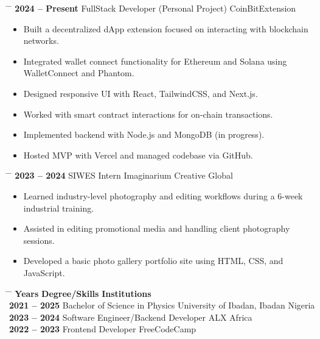 \documentclass{article}
\newcommand{\sectiondivider}[2][0.4]{%
    \noindent
    \vspace{3pt}
    \textcolor{black}{%
        \noindent
        \makebox[\linewidth]{\rule{#1\linewidth}{0.5pt}%
        \hspace{5pt} \textbf{\uppercase{#2}} \hspace{5pt}%
        \rule{#1\linewidth}{0.5pt}}%
    }
    \vspace{3pt}
}
\begin{document}
\vspace{0.2cm}
\noindent
\begin{tabbing}
    \hspace{5cm} \= \hspace{8cm} \= \kill 
    \textbf{2024 -- Present} \> FullStack Developer (Personal Project)  \> CoinBitExtension \\[0.1cm]
\end{tabbing}
\vspace{-0.3cm}
\begin{itemize}
    \item Built a decentralized dApp extension focused on interacting with blockchain networks.
    \item Integrated wallet connect functionality for Ethereum and Solana using WalletConnect and Phantom.
    \item Designed responsive UI with React, TailwindCSS, and Next.js.
    \item Worked with smart contract interactions for on-chain transactions.
    \item Implemented backend with Node.js and MongoDB (in progress).
    \item Hosted MVP with Vercel and managed codebase via GitHub.
\end{itemize}

\vspace{0.2cm}
\noindent
\begin{tabbing}
    \hspace{5cm} \= \hspace{8cm} \= \kill 
    \textbf{2023 -- 2024} \> SIWES Intern  \> Imaginarium Creative Global \\[0.1cm]
\end{tabbing}
\vspace{-0.3cm}
\begin{itemize}
    \item Learned industry-level photography and editing workflows during a 6-week industrial training.
    \item Assisted in editing promotional media and handling client photography sessions.
    \item Developed a basic photo gallery portfolio site using HTML, CSS, and JavaScript.
\end{itemize}

\vspace{0.5cm}
\sectiondivider[0.44]{Education}
\noindent
\begin{tabbing}
    \hspace{5cm} \= \hspace{8cm} \= \kill
    \textbf{Years} \> \textbf{Degree/Skills}  \> \textbf{Institutions} \\[0.3cm]
    \textbf{2021 -- 2025} \> Bachelor of Science in Physics  \> University of Ibadan, Ibadan Nigeria \\[0.2cm]
    \textbf{2023 -- 2024} \> Software Engineer/Backend Developer  \> ALX Africa \\[0.2cm]
    \textbf{2022 -- 2023} \> Frontend Developer  \> FreeCodeCamp \\
    
\end{tabbing}
\end{document}
